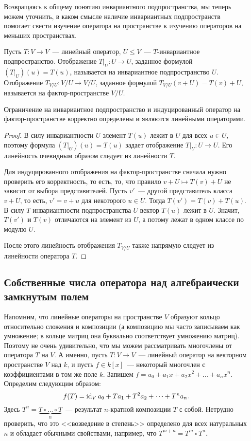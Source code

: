 Возвращаясь к общему понятию инвариантного подпространства, мы теперь
можем уточнить, в каком смысле наличие инвариантных подпространств
помогает свести изучение оператора на пространстве к изучению
операторов на меньших пространствах.
\begin{definition}
Пусть $T\colon V\to V$~--- линейный оператор, $U\leq V$~---
$T$-инвариантное подпространство.
Отображение $T|_U\colon U\to U$, заданное формулой
$(T|_U)(u) = T(u)$, называется 
на инвариантное подпространство $U$.
Отображение $T_{V/U}\colon V/U\to V/U$, заданное формулой
$T_{V/U}(v+U) = T(v) + U$, называется 
на фактор-пространстве $V/U$.
\end{definition}
\begin{proposition}
Ограничение на инвариантное подпространство и индуцированный оператор
на фактор-пространстве корректно определены и являются линейными
операторами.
\end{proposition}
\begin{proof}
В силу инвариантности $U$ элемент $T(u)$ лежит в $U$ для всех $u\in U$,
поэтому формула $(T|_U)(u) = T(u)$ задает
отображение $T|_U\colon U\to U$. Его линейность очевидным образом
следует из линейности $T$.

Для индуцированного отображения на фактор-пространстве сначала нужно
проверить его корректность, то есть, то, что
правило $v+U \mapsto T(v) + U$ не зависит от выбора представителей.
Пусть $v'$~--- другой представитель класса $v+U$, то есть,
$v' = v + u$ для некоторого $u\in U$.
Тогда $T(v') = T(v) + T(u)$. В силу $T$-инвариантности подпространства
$U$ вектор $T(u)$ лежит в $U$. Значит, $T(v')$ и $T(v)$ отличаются
на элемент из $U$, а потому лежат в одном классе по модулю $U$.

После этого линейность отображения $T_{V/U}$ также напрямую следует
из линейности оператора $T$.
\end{proof}

\subsection{Собственные числа оператора над алгебраически замкнутым полем}

Напомним, что линейные операторы на пространстве $V$ образуют кольцо
относительно сложения и композиции (а композицию мы часто записываем
как умножение; в кольце матриц она буквально соответствует
умножению матриц). Поэтому не очень удивительно,
что мы можем рассматривать многочлены от оператора $T$ на $V$.
А именно, пусть $T\colon V\to V$~--- линейный оператор на
векторном пространстве $V$ над $k$, и пусть $f\in k[x]$~--- некоторый
многочлен с коэффициентами в том же поле $k$.
Запишем $f = a_0 + a_1x + a_2x^2 + \dots + a_{n}x^n$.
Определим 
следующим образом:
$$
f(T) = \operatorname{id}_V a_0 + Ta_1 + T^2a_2 + \dots + T^n a_n.
$$
Здесь $T^n = \underbrace{T\circ\dots\circ T}_{n}$~--- результат
$n$-кратной композиции $T$ с собой. Нетрудно проверить, что это
<<возведение в степень>> определено для всех натуральных $n$
и обладает обычными свойствами, например, что $T^{m+n} = T^m\circ T^n$.

